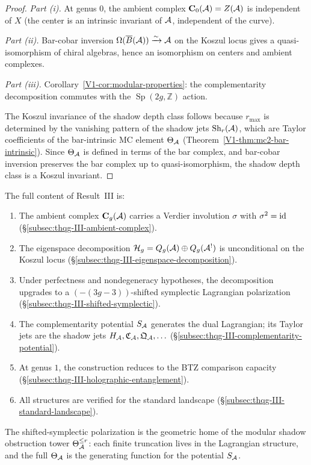 \begin{proof}
\emph{Part (i).}
At genus $0$, the ambient complex
$\mathbf{C}_0(\mathcal{A}) = Z(\mathcal{A})$ is independent of $X$
(the center is an intrinsic invariant of $\mathcal{A}$,
independent of the curve).

\emph{Part (ii).}
Bar-cobar inversion
$\Omega(\overline{B}(\mathcal{A})) \xrightarrow{\sim} \mathcal{A}$ on the Koszul
locus gives a quasi-isomorphism of chiral algebras, hence
an isomorphism on centers and ambient complexes.

\emph{Part (iii).}
Corollary~\ref{V1-cor:modular-properties}: the complementarity
decomposition commutes with the $\operatorname{Sp}(2g, \mathbb{Z})$
action.

The Koszul invariance of the shadow depth class follows because
$r_{\max}$ is determined by the vanishing pattern of the shadow
jets $\mathrm{Sh}_r(\mathcal{A})$, which are Taylor coefficients of the
bar-intrinsic MC element $\Theta_{\mathcal{A}}$
(Theorem~\ref*{V1-thm:mc2-bar-intrinsic}). Since $\Theta_{\mathcal{A}}$ is
defined in terms of the bar complex, and bar-cobar inversion
preserves the bar complex up to quasi-isomorphism, the shadow
depth class is a Koszul invariant.
\end{proof}

\begin{remark}
The full content of Result~III is:
\begin{enumerate}[label=\textup{(\arabic*)}]
\item The ambient complex $\mathbf{C}_g(\mathcal{A})$ carries a
 Verdier involution $\sigma$ with $\sigma^2 = \mathrm{id}$
 (\S\ref{subsec:thqg-III-ambient-complex}).
\item The eigenspace decomposition
 $\mathcal{H}_g = Q_g(\mathcal{A}) \oplus Q_g(\mathcal{A}^!)$ is
 unconditional on the Koszul locus
 (\S\ref{subsec:thqg-III-eigenspace-decomposition}).
\item Under perfectness and nondegeneracy hypotheses,
 the decomposition upgrades to a $(-(3g-3))$-shifted
 symplectic Lagrangian polarization
 (\S\ref{subsec:thqg-III-shifted-symplectic}).
\item The complementarity potential $S_{\mathcal{A}}$ generates the
 dual Lagrangian; its Taylor jets are the shadow jets
 $H_{\mathcal{A}}, \mathfrak{C}_{\mathcal{A}}, \mathfrak{Q}_{\mathcal{A}}, \ldots$
 (\S\ref{subsec:thqg-III-complementarity-potential}).
\item At genus $1$, the construction reduces to the
 BTZ comparison capacity
 (\S\ref{subsec:thqg-III-holographic-entanglement}).
\item All structures are verified for the standard landscape
 (\S\ref{subsec:thqg-III-standard-landscape}).
\end{enumerate}
The shifted-symplectic polarization is the geometric home of
the modular shadow obstruction tower $\Theta_{\mathcal{A}}^{\le r}$: each finite
truncation lives in the Lagrangian structure, and the full
$\Theta_{\mathcal{A}}$ is the generating function for the potential
$S_{\mathcal{A}}$.
\end{remark}

